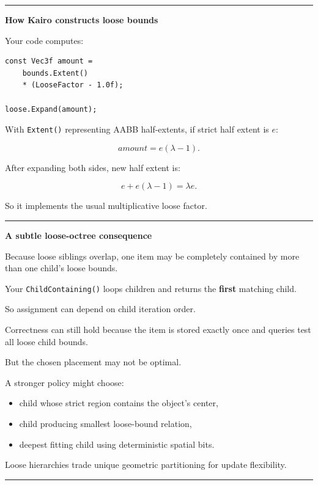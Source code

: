 \begin{center}\rule{0.5\linewidth}{0.5pt}\end{center}

\textbf{How Kairo constructs loose bounds}

Your code computes:

\begin{verbatim}
const Vec3f amount =
    bounds.Extent()
    * (LooseFactor - 1.0f);

loose.Expand(amount);
\end{verbatim}

With \texttt{Extent()} representing AABB half-extents, if strict half extent is \(e\):

\[
amount=e(\lambda-1).
\]

After expanding both sides, new half extent is:

\[
e+e(\lambda-1)
=
\lambda e.
\]

So it implements the usual multiplicative loose factor.

\begin{center}\rule{0.5\linewidth}{0.5pt}\end{center}

\textbf{A subtle loose-octree consequence}

Because loose siblings overlap, one item may be completely contained by more than one child's loose bounds.

Your \texttt{ChildContaining()} loops children and returns the \textbf{first} matching child.

So assignment can depend on child iteration order.

Correctness can still hold because the item is stored exactly once and queries test all loose child bounds.

But the chosen placement may not be optimal.

A stronger policy might choose:

\begin{itemize}
\tightlist
\item
  child whose strict region contains the object's center,
\item
  child producing smallest loose-bound relation,
\item
  deepest fitting child using deterministic spatial bits.
\end{itemize}

Loose hierarchies trade unique geometric partitioning for update flexibility.

\begin{center}\rule{0.5\linewidth}{0.5pt}\end{center}

